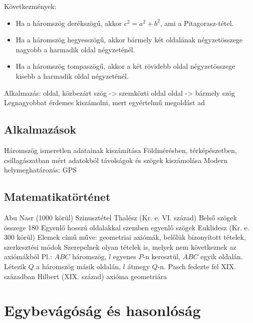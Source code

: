 \documentclass[twoside,12pt]{report}
\theoremstyle{definition}
\begin{document}
	Következmények:
	\begin{itemize}
		\item Ha a háromszög derékszögű, akkor $c^2=a^2+b^2$, ami a Pitagorasz-tétel.
		\item Ha a háromszög hegyesszögű, akkor bármely két oldalának négyzetösszege nagyobb a harmadik oldal négyzeténél.
		\item Ha a háromszög tompaszögű, akkor a két rövidebb oldal négyzetösszege kisebb a harmadik oldal négyzeténél.
	\end{itemize}
	\begin{outline}
		\1 Alkalmazás:
			 oldal, közbezárt szög -> szemközti oldal
			 oldal -> bármely szög
				\3 Legnagyobbat érdemes kiszámolni, mert egyértelmű megoldást ad
	\end{outline}
\section{Alkalmazások}
	\begin{outline}
		\1 Háromszög ismeretlen adatainak kiszámítása
		\1 Földmérésben, térképészetben, csillagászatban mért adatokból távolságok és szögek kiszámolása
		\1 Modern helymeghatározás: GPS
	\end{outline}
\section{Matematikatörténet}
	\begin{outline}
		\1 Abu Nasr (1000 körül)
			\2 Szinusztétel
		\1 Thalész (Kr. e. VI. század)
			\2 Belső szögek összege 180\degree
			\2 Egyenlő hosszú oldalakkal szemben egyenlő szögek
		\1 Euklidesz (Kr. e. 300 körül)
			\2 Elemek című műve: geometriai axiómák, belőlük bizonyított tételek, szerkesztési módok
			\2 Szerepelnek olyan tételek is, melyek nem következnek az axiómákból
			\2 Pl.:  $ABC$ háromszög, $l$ egyenes $P$-n keresztül, $ABC$ egyik oldalán. Létezik $Q$ a háromszög másik oldalán, $l$ átmegy $Q$-n.
				\3 Pasch fedezte fel XIX. században
		\1 Hilbert (XIX. század)
			 axióma geometriára
	\end{outline}
\chapter{Egybevágóság és hasonlóság}
\end{document}
